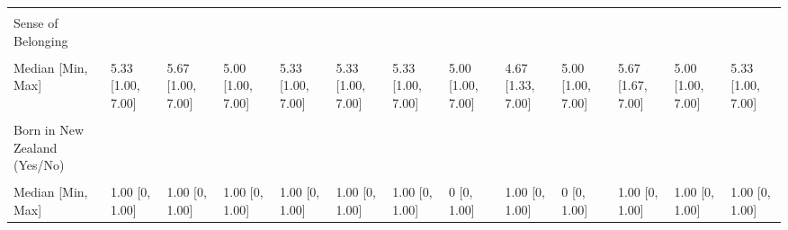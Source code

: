 \documentclass[
  single column]{article}
\begin{document}
\begin{landscape}
\begin{longtable}[t]{lllllllllllll}
\cellcolor{gray!10}{Missing} & \cellcolor{gray!10}{2766 (12.8\%)} & \cellcolor{gray!10}{168 (12.3\%)} & \cellcolor{gray!10}{57 (21.1\%)} & \cellcolor{gray!10}{279 (13.8\%)} & \cellcolor{gray!10}{647 (17.5\%)} & \cellcolor{gray!10}{235 (21.5\%)} & \cellcolor{gray!10}{26 (19.1\%)} & \cellcolor{gray!10}{17 (19.5\%)} & \cellcolor{gray!10}{345 (52.4\%)} & \cellcolor{gray!10}{75 (13.0\%)} & \cellcolor{gray!10}{159 (21.4\%)} & \cellcolor{gray!10}{4774 (14.8\%)}\\
Sense of Belonging &  &  &  &  &  &  &  &  &  &  &  & \\
\cellcolor{gray!10}{Mean (SD)} & \cellcolor{gray!10}{5.11 (1.14)} & \cellcolor{gray!10}{5.37 (1.05)} & \cellcolor{gray!10}{4.99 (1.24)} & \cellcolor{gray!10}{5.26 (1.11)} & \cellcolor{gray!10}{5.19 (1.13)} & \cellcolor{gray!10}{5.23 (1.15)} & \cellcolor{gray!10}{4.99 (1.21)} & \cellcolor{gray!10}{4.65 (1.16)} & \cellcolor{gray!10}{4.83 (1.21)} & \cellcolor{gray!10}{5.38 (1.03)} & \cellcolor{gray!10}{4.84 (1.30)} & \cellcolor{gray!10}{5.13 (1.14)}\\
Median [Min, Max] & 5.33 [1.00, 7.00] & 5.67 [1.00, 7.00] & 5.00 [1.00, 7.00] & 5.33 [1.00, 7.00] & 5.33 [1.00, 7.00] & 5.33 [1.00, 7.00] & 5.00 [1.00, 7.00] & 4.67 [1.33, 7.00] & 5.00 [1.00, 7.00] & 5.67 [1.67, 7.00] & 5.00 [1.00, 7.00] & 5.33 [1.00, 7.00]\\
\addlinespace
\cellcolor{gray!10}{Missing} & \cellcolor{gray!10}{103 (0.5\%)} & \cellcolor{gray!10}{11 (0.8\%)} & \cellcolor{gray!10}{2 (0.7\%)} & \cellcolor{gray!10}{11 (0.5\%)} & \cellcolor{gray!10}{23 (0.6\%)} & \cellcolor{gray!10}{3 (0.3\%)} & \cellcolor{gray!10}{0 (0\%)} & \cellcolor{gray!10}{2 (2.3\%)} & \cellcolor{gray!10}{3 (0.5\%)} & \cellcolor{gray!10}{1 (0.2\%)} & \cellcolor{gray!10}{7 (0.9\%)} & \cellcolor{gray!10}{166 (0.5\%)}\\
Born in New Zealand (Yes/No) &  &  &  &  &  &  &  &  &  &  &  & \\
\cellcolor{gray!10}{Mean (SD)} & \cellcolor{gray!10}{0.794 (0.405)} & \cellcolor{gray!10}{0.831 (0.375)} & \cellcolor{gray!10}{0.587 (0.493)} & \cellcolor{gray!10}{0.786 (0.410)} & \cellcolor{gray!10}{0.776 (0.417)} & \cellcolor{gray!10}{0.747 (0.435)} & \cellcolor{gray!10}{0.441 (0.498)} & \cellcolor{gray!10}{0.667 (0.474)} & \cellcolor{gray!10}{0.230 (0.421)} & \cellcolor{gray!10}{0.890 (0.313)} & \cellcolor{gray!10}{0.779 (0.415)} & \cellcolor{gray!10}{0.778 (0.416)}\\
Median [Min, Max] & 1.00 [0, 1.00] & 1.00 [0, 1.00] & 1.00 [0, 1.00] & 1.00 [0, 1.00] & 1.00 [0, 1.00] & 1.00 [0, 1.00] & 0 [0, 1.00] & 1.00 [0, 1.00] & 0 [0, 1.00] & 1.00 [0, 1.00] & 1.00 [0, 1.00] & 1.00 [0, 1.00]\\

\end{longtable}
\end{landscape}
\end{document}
